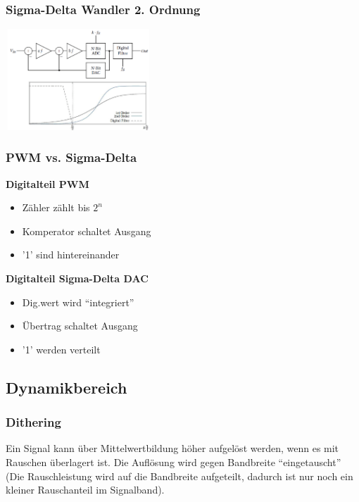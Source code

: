 \begin{multicols}{3}
  \subsubsection{Sigma-Delta Wandler 2. Ordnung}
    \includegraphics[width=5.5cm, height =3.8cm]{images/deltaSigma2}
  
  \columnbreak
  
  \subsubsection{PWM vs. Sigma-Delta}
      \textbf{Digitalteil PWM}
      \begin{itemize}
        \item Zähler zählt bis $2^n$
        \item Komperator schaltet Ausgang
        \item '1' sind hintereinander
      \end{itemize}
      
      \textbf{Digitalteil Sigma-Delta DAC}
      \begin{itemize}
        \item Dig.wert wird "`integriert"'
        \item Übertrag schaltet Ausgang
        \item '1' werden verteilt
      \end{itemize}
      \columnbreak
      \subsection{Dynamikbereich}
\subsubsection{Dithering}
  Ein Signal kann über Mittelwertbildung höher aufgelöst werden, wenn es mit Rauschen überlagert ist.
  Die Auflösung wird gegen Bandbreite "`eingetauscht"' (Die Rauschleistung wird auf die Bandbreite aufgeteilt,
  dadurch ist nur noch ein kleiner Rauschanteil im Signalband).
  

\end{multicols}
